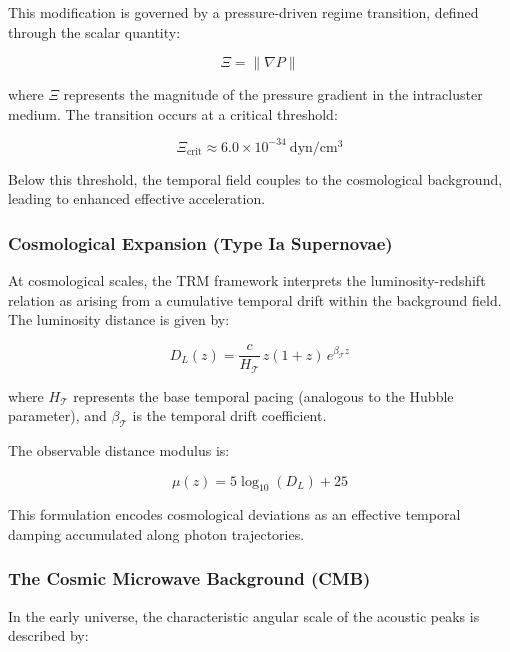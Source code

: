 \documentclass[11pt]{article}
\begin{document}
This modification is governed by a pressure-driven regime transition, defined through the scalar quantity:

\begin{equation}
	\Xi = \|\nabla P\|
\end{equation}

where $\Xi$ represents the magnitude of the pressure gradient in the intracluster medium. The transition occurs at a critical threshold:

\begin{equation}
	\Xi_{\mathrm{crit}} \approx 6.0 \times 10^{-34}\ \mathrm{dyn/cm^3}
\end{equation}

Below this threshold, the temporal field couples to the cosmological background, leading to enhanced effective acceleration.

\subsubsection{Cosmological Expansion (Type Ia Supernovae)}

At cosmological scales, the TRM framework interprets the luminosity-redshift relation as arising from a cumulative temporal drift within the background field. The luminosity distance is given by:

\begin{equation}
	D_L(z) = \frac{c}{H_{\mathcal{T}}} \, z (1+z) \, e^{\beta_{\mathcal{T}} z}
\end{equation}

where $H_{\mathcal{T}}$ represents the base temporal pacing (analogous to the Hubble parameter), and $\beta_{\mathcal{T}}$ is the temporal drift coefficient.

The observable distance modulus is:

\begin{equation}
	\mu(z) = 5 \log_{10}(D_L) + 25
\end{equation}

This formulation encodes cosmological deviations as an effective temporal damping accumulated along photon trajectories.

\subsubsection{The Cosmic Microwave Background (CMB)}

In the early universe, the characteristic angular scale of the acoustic peaks is described by:
\end{document}
